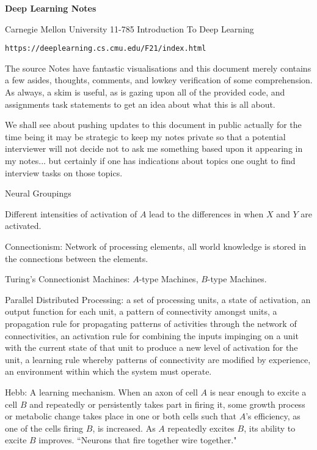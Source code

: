 \Large

\textbf{Deep Learning Notes}

Carnegie Mellon University 11-785 Introduction To Deep Learning

\begin{verbatim}
https://deeplearning.cs.cmu.edu/F21/index.html
\end{verbatim}

The source Notes have fantastic visualisations and this document merely contains a few asides, thoughts, comments, and lowkey verification of some comprehension. As always, a skim is useful, as is gazing upon all of the provided code, and assignments task statements to get an idea about what this is all about.

We shall see about pushing updates to this document in public actually for the time being it may be strategic to keep my notes private so that a potential interviewer will not decide not to ask me something based upon it appearing in my notes... but certainly if one has indications about topics one ought to find interview tasks on those topics.

Neural Groupings

Different intensities of activation of $A$ lead to the differences in when $X$ and $Y$ are activated.

Connectionism: Network of processing elements, all world knowledge is stored in the connections between the elements.

Turing's Connectionist Machines: $A$-type Machines, $B$-type Machines.

Parallel Distributed Processing: a set of processing units, a state of activation, an output function for each unit, a pattern of connectivity amongst units, a propagation rule for propagating patterns of activities through the network of connectivities, an activation rule for combining the inputs impinging on a unit with the current state of that unit to produce a new level of activation for the unit, a learning rule whereby patterns of connectivity are modified by experience, an environment within which the system must operate.

Hebb: A learning mechanism. When an axon of cell $A$ is near enough to excite a cell $B$ and repeatedly or persistently takes part in firing it, some growth process or metabolic change takes place in one or both cells such that $A$'s efficiency, as one of the cells firing $B$, is increased. As $A$ repeatedly excites $B$, its ability to excite $B$ improves. ``Neurons that fire together wire together."

